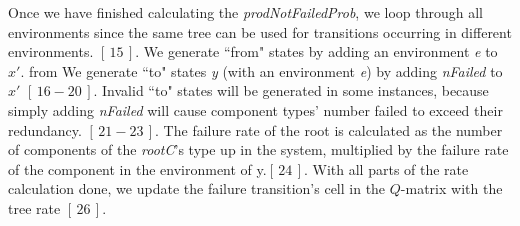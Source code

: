 \documentclass[12pt]{article}
\newcommand{\varName}[1]{\textrm{\it#1}}
\newcommand{\citeLine}[1]{$[\,#1\,]$}
\newcommand{\citeBlock}[2]{$[\,#1 - #2\,]$}
\begin{document}
Once we have finished calculating the \textit{prodNotFailedProb}, we loop through all environments since the same tree can be used for transitions occurring in different environments. \citeLine{15}. We generate ``from" states by adding an environment \textit{e} to $x'$. from We generate ``to" states \textit{y} (with an environment \textit{e}) by adding \textit{nFailed} to $x'$ \citeBlock{16}{20}. Invalid ``to" states will be generated in some instances, because simply adding \textit{nFailed} will cause component types' number failed to exceed their redundancy. \citeBlock{21}{23}. The failure rate of the root is calculated as the number of components of the \varName{rootC}'s type up in the system, multiplied by the failure rate of the component in the environment of y.\citeLine{24}. With all parts of the rate calculation done, we update the failure transition's cell in the $Q$-matrix with the tree rate \citeLine{26}.
\end{document}

